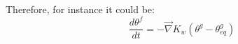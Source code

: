 Therefore, for instance it could be:
\begin{equation}
\frac{d \theta^f}{dt} = - \vec{\nabla} K_w ({\theta^g - \theta^g_{eq}})
\end{equation}